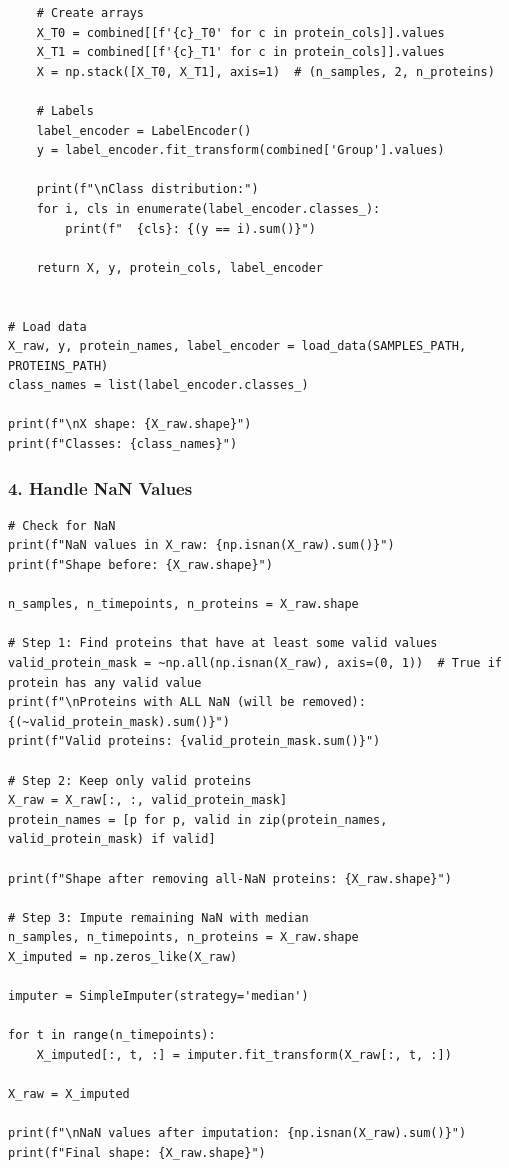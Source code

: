 \begin{lstlisting}
    # Create arrays
    X_T0 = combined[[f'{c}_T0' for c in protein_cols]].values
    X_T1 = combined[[f'{c}_T1' for c in protein_cols]].values
    X = np.stack([X_T0, X_T1], axis=1)  # (n_samples, 2, n_proteins)
 
    # Labels
    label_encoder = LabelEncoder()
    y = label_encoder.fit_transform(combined['Group'].values)
 
    print(f"\nClass distribution:")
    for i, cls in enumerate(label_encoder.classes_):
        print(f"  {cls}: {(y == i).sum()}")
 
    return X, y, protein_cols, label_encoder
 
 
# Load data
X_raw, y, protein_names, label_encoder = load_data(SAMPLES_PATH, PROTEINS_PATH)
class_names = list(label_encoder.classes_)
 
print(f"\nX shape: {X_raw.shape}")
print(f"Classes: {class_names}")
\end{lstlisting}
 
\subsubsection*{4. Handle NaN Values}
 
\begin{lstlisting}
# Check for NaN
print(f"NaN values in X_raw: {np.isnan(X_raw).sum()}")
print(f"Shape before: {X_raw.shape}")
 
n_samples, n_timepoints, n_proteins = X_raw.shape
 
# Step 1: Find proteins that have at least some valid values
valid_protein_mask = ~np.all(np.isnan(X_raw), axis=(0, 1))  # True if protein has any valid value
print(f"\nProteins with ALL NaN (will be removed): {(~valid_protein_mask).sum()}")
print(f"Valid proteins: {valid_protein_mask.sum()}")
 
# Step 2: Keep only valid proteins
X_raw = X_raw[:, :, valid_protein_mask]
protein_names = [p for p, valid in zip(protein_names, valid_protein_mask) if valid]
 
print(f"Shape after removing all-NaN proteins: {X_raw.shape}")
 
# Step 3: Impute remaining NaN with median
n_samples, n_timepoints, n_proteins = X_raw.shape
X_imputed = np.zeros_like(X_raw)
 
imputer = SimpleImputer(strategy='median')
 
for t in range(n_timepoints):
    X_imputed[:, t, :] = imputer.fit_transform(X_raw[:, t, :])
 
X_raw = X_imputed
 
print(f"\nNaN values after imputation: {np.isnan(X_raw).sum()}")
print(f"Final shape: {X_raw.shape}")
\end{lstlisting}
 
